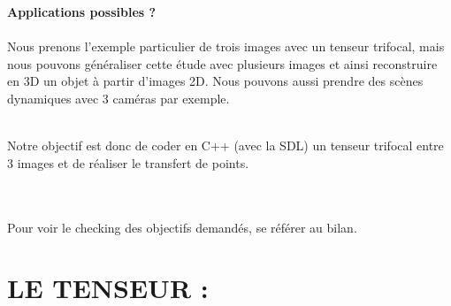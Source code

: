 \documentclass[a4paper,11pt,fleqn]{report}
\begin{document}
	\normalsize{
	\textbf{Applications possibles ?}\\
	\\ Nous prenons l'exemple particulier de trois images avec un tenseur trifocal, mais nous pouvons g\'en\'eraliser cette \'etude avec plusieurs images et ainsi reconstruire en 3D un objet \`a partir d'images 2D. Nous pouvons aussi prendre des sc\`enes dynamiques avec 3 cam\'eras par exemple.}
		
		\\Notre objectif est donc de coder en C++ (avec la SDL) un tenseur trifocal entre 3 images et de r\'ealiser le transfert de points. \\\\\\
		\begin{em}Pour voir le checking des objectifs demand\'es, se r\'ef\'erer au bilan.\end{em}
		
		
	\chapter{LE TENSEUR :}
\end{document}
